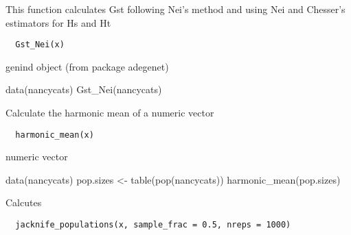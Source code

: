 \documentclass[letterpaper]{book}
\begin{document}
%
\begin{Description}\relax
This function calculates Gst following Nei's method and
using Nei and Chesser's estimators for Hs and Ht
\end{Description}
%
\begin{Usage}
\begin{verbatim}
  Gst_Nei(x)
\end{verbatim}
\end{Usage}
%
\begin{Arguments}
\begin{ldescription}
\item[\code{x}] genind object (from package adegenet)
\end{ldescription}
\end{Arguments}
%
\begin{Examples}
\begin{ExampleCode}
data(nancycats)
Gst_Nei(nancycats)
\end{ExampleCode}
\end{Examples}
%
\begin{Description}\relax
Calculate the harmonic mean of a numeric vector
\end{Description}
%
\begin{Usage}
\begin{verbatim}
  harmonic_mean(x)
\end{verbatim}
\end{Usage}
%
\begin{Arguments}
\begin{ldescription}
\item[\code{x}] numeric vector
\end{ldescription}
\end{Arguments}
%
\begin{Examples}
\begin{ExampleCode}
data(nancycats)
pop.sizes <- table(pop(nancycats))
harmonic_mean(pop.sizes)
\end{ExampleCode}
\end{Examples}
%
\begin{Description}\relax
Calcutes
\end{Description}
%
\begin{Usage}
\begin{verbatim}
  jacknife_populations(x, sample_frac = 0.5, nreps = 1000)
\end{verbatim}
\end{Usage}
\end{document}
